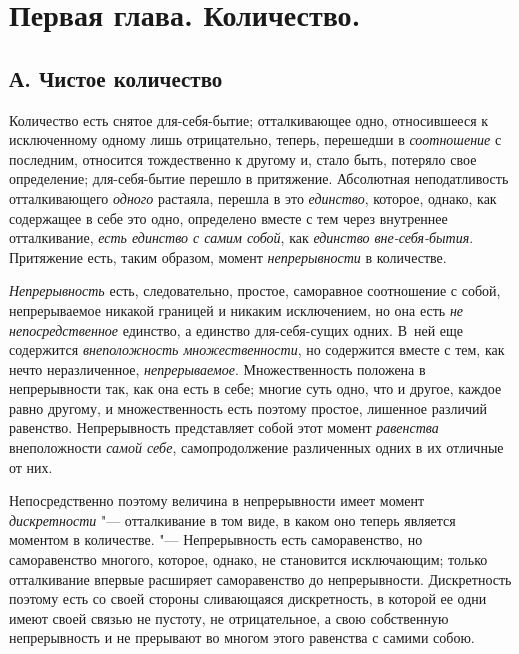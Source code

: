 \chapter[{\em Первая глава} \newline Количество]{Первая глава. Количество.}
\section[А. Чистое количество]{А. Чистое количество}

Количество есть снятое для-себя-бытие; отталкивающее одно, относившееся к
исключенному одному лишь отрицательно, теперь, перешедши в
{\em соотношение} с последним, относится тождественно к
другому и, стало быть, потеряло свое определение; для-себя-бытие перешло в
притяжение. Абсолютная неподатливость отталкивающего
{\em одного} растаяла, перешла в это
{\em единство}, которое, однако, как содержащее в себе
это одно, определено вместе с тем через внутреннее отталкивание,
{\em есть единство с самим собой}, как
{\em единство вне-себя-бытия}. Притяжение есть, таким
образом, момент {\em непрерывности} в количестве.

{\em Непрерывность} есть, следовательно, простое,
саморавное соотношение с собой, непрерываемое никакой границей и никаким
исключением, но она есть {\em не непосредственное}
единство, а единство для-себя-сущих одних. В~ней еще содержится
{\em внеположность множественности}, но содержится
вместе с тем, как нечто неразличенное,
{\em непрерываемое}. Множественность положена в
непрерывности так, как она есть в себе; многие суть одно, что и другое,
каждое равно другому, и множественность есть поэтому простое, лишенное
различий равенство. Непрерывность представляет собой этот момент
{\em равенства} внеположности {\em самой себе}, самопродолжение
различенных одних в их отличные от них.

Непосредственно поэтому величина в непрерывности имеет момент
{\em дискретности} "--- отталкивание в том виде, в каком
оно теперь является моментом в количестве. "--- Непрерывность есть
саморавенство, но саморавенство многого, которое, однако, не становится
исключающим; только отталкивание впервые расширяет саморавенство до
непрерывности. Дискретность поэтому есть со своей стороны сливающаяся
дискретность, в которой ее одни имеют своей связью не пустоту, не
отрицательное, а свою собственную непрерывность и не прерывают во многом
этого равенства с самими собою.

